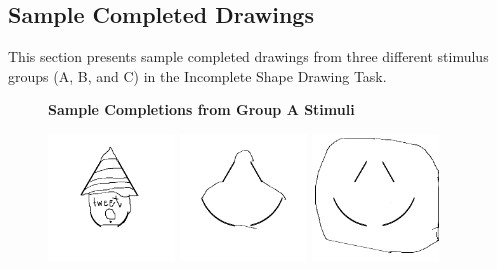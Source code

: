 \documentclass[../MA_Thesis.tex]{subfiles}
\begin{document}
\begin{appendix}
\section{Sample Completed Drawings}
\label{appendix: sample_completed_drawings}

This section presents sample completed drawings from three different stimulus groups (A, B, and C) in the Incomplete Shape Drawing Task.

\begin{figure}[H]
\centering
\textbf{Sample Completions from Group A Stimuli}\par\medskip
\includegraphics[width=0.3\textwidth]{sample_completed_shapes/Group_1_Sample_1.png}
\includegraphics[width=0.3\textwidth]{sample_completed_shapes/Group_1_Sample_2.png}
\includegraphics[width=0.3\textwidth]{sample_completed_shapes/Group_1_Sample_3.png}
\end{figure}


\end{appendix}
\end{document}
